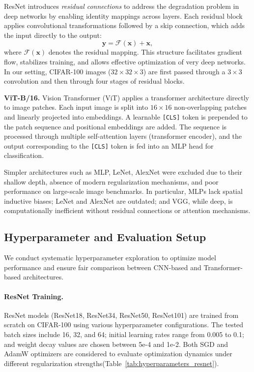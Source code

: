 \documentclass[conference]{IEEEtran}
\begin{document}
ResNet introduces \textit{residual connections} to address the degradation problem in deep networks by enabling identity mappings across layers. Each residual block applies convolutional transformations followed by a skip connection, which adds the input directly to the output:
\[
\mathbf{y} = \mathcal{F}(\mathbf{x}) + \mathbf{x},
\]
where \( \mathcal{F}(\mathbf{x}) \) denotes the residual mapping. This structure facilitates gradient flow, stabilizes training, and allows effective optimization of very deep networks. In our setting, CIFAR-100 images (\(32\times32\times3\)) are first passed through a \(3\times3\) convolution and then through four stages of residual blocks.

\textbf{ViT-B/16.} Vision Transformer (ViT) applies a transformer architecture directly to image patches. Each input image is split into \(16\times16\) non-overlapping patches and linearly projected into embeddings. A learnable \texttt{[CLS]} token is prepended to the patch sequence and positional embeddings are added. The sequence is processed through multiple self-attention layers (transformer encoder), and the output corresponding to the \texttt{[CLS]} token is fed into an MLP head for classification.

Simpler architectures such as MLP, LeNet, AlexNet were excluded due to their shallow depth, absence of modern regularization mechanisms, and poor performance on large-scale image benchmarks. In particular, MLPs lack spatial inductive biases; LeNet and AlexNet are outdated; and VGG, while deep, is computationally inefficient without residual connections or attention mechanisms.

\subsection{Hyperparameter and Evaluation Setup}

We conduct systematic hyperparameter exploration to optimize model performance and ensure fair comparison between CNN-based and Transformer-based architectures.

\paragraph{ResNet Training.} ResNet models (ResNet18, ResNet34, ResNet50, ResNet101) are trained from scratch on CIFAR-100 using various hyperparameter configurations. The tested batch sizes include 16, 32, and 64; initial learning rates range from 0.005 to 0.1; and weight decay values are chosen between 5e-4 and 1e-2. Both SGD and AdamW optimizers are considered to evaluate optimization dynamics under different regularization strengths(Table~\ref{tab:hyperparameters_resnet}).
\end{document}
